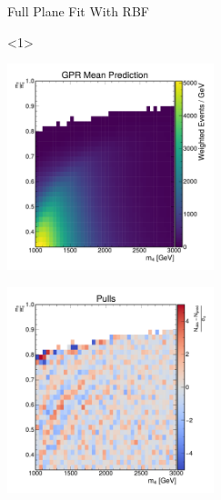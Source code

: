 \documentclass[10pt]{beamer}
\begin{document}
\begin{frame}{Full Plane Fit With RBF}
  \begin{center}
    \begin{onlyenv}<1>
      \begin{annotimage}{\includegraphics[width=0.45\textwidth]{figures/rbf_gp_mean.pdf}}
      \end{annotimage}
      \begin{annotimage}{\includegraphics[width=0.45\textwidth]{figures/2dpullplots/rbf/NoWindow.pdf}}
      \end{annotimage}
    \end{onlyenv}
  \end{center}
\end{frame}


\newcommand{\makegrid}[6]{
  \begin{center}
    \blockcite[(0,1em)]{#1}{$m_{\stopq}=1200\,,\,m_{\chi}=600$}
    \blockcite[(0,1em)]{#2}{$m_{\stopq}=1500\,,\,m_{\chi}=750$}
    \blockcite[(0,1em)]{#3}{$m_{\stopq}=1500\,,\,m_{\chi}=750$}
  \end{center}
  \begin{center}
    \blockcite[(0,1em)]{#4}{$m_{\stopq}=1500\,,\,m_{\chi}=750$}
    \blockcite[(0,1em)]{#5}{$m_{\stopq}=2000\,,\,m_{\chi}=1400$}
    \blockcite[(0,1em)]{#6}{$m_{\stopq}=2000\,,\,m_{\chi}=1000$}
  \end{center}

}
\end{document}
